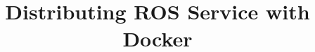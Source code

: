 \documentclass[conference]{IEEEtran}
\begin{document}
\title{Distributing ROS Service with Docker}


\maketitle



\IEEEpeerreviewmaketitle







%

\nocite{*}


\end{document}

